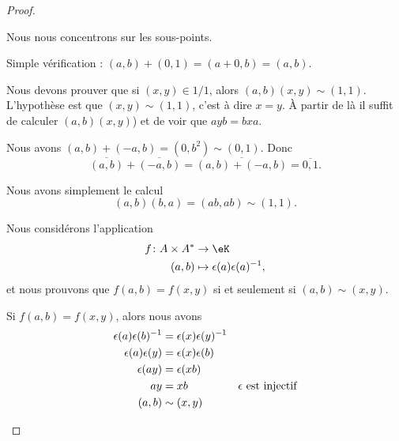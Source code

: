 \begin{proof}
\begin{subproof}
		Nous nous concentrons sur les sous-points.

		\begin{subproof}
			Simple vérification  : \( (a,b)+(0,1)=(a+0,b)=(a,b)\).


			Nous devons prouver que si \( (x,y)\in 1/1\), alors \( (a,b)(x,y)\sim(1,1)\). L'hypothèse est que \( (x,y)\sim (1,1)\), c'est à dire \( x=y\). À partir de là il suffit de calculer \( (a,b)(x,y)\)) et de voir que \( ayb=bxa\).

			Nous avons \( (a,b)+(-a,b)=(0,b^2)\sim (0,1)\). Donc
			\begin{equation}
				\overline{(a,b)}+\overline{(-a,b)}=\overline{(a,b)+(-a,b)}=\overline{0,1}.
			\end{equation}

			Nous avons simplement le calcul
			\begin{equation}
				(a,b)(b,a)=(ab,ab)\sim (1,1).
			\end{equation}
		\end{subproof}

		\spitem[Morphisme de corps]
		Nous considérons l'application
		\begin{equation}
			\begin{aligned}
				f\colon A\times A^* & \to \eK                              \\
				(a,b)               & \mapsto \epsilon(a)\epsilon(a)^{-1},
			\end{aligned}
		\end{equation}
		et nous prouvons que \( f(a,b)=f(x,y)\) si et seulement si \( (a,b)\sim(x,y)\).

		\begin{subproof}
			\spitem[\( \Rightarrow\)]
			Si \( f(a,b)=f(x,y)\), alors nous avons
			\begin{subequations}
				\begin{align}
					\epsilon(a)\epsilon(b)^{-1} & =\epsilon(x)\epsilon(y)^{-1}                                     \\
					\epsilon(a)\epsilon(y)      & =\epsilon(x)\epsilon(b)                                          \\
					\epsilon(ay)                & =\epsilon(xb)                                                    \\
					ay                          & =xb                          & \text{\( \epsilon\) est injectif} \\
					(a,b)                       & \sim(x,y)
				\end{align}
			\end{subequations}


\end{subproof}
\end{subproof}
\end{proof}
